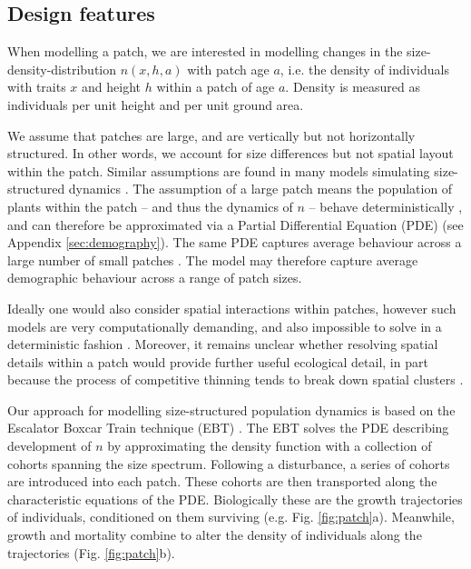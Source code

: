 \documentclass[a4paper,11pt]{article}
\begin{document}
\subsection{Design features}

When modelling a patch, we are interested in modelling changes in the
size-density-distribution \(n(x,h,a)\) with patch age \(a\), i.e. the density of
individuals with traits \(x\) and height \(h\) within a patch of age \(a\). Density
is measured as individuals per unit height and per unit ground area.

We assume that patches are large, and are vertically but not horizontally
structured. In other words, we account for size differences but not spatial 
layout within the patch. Similar assumptions are found in many models
simulating size-structured dynamics
\citep{Moorcroft-2001, Huston-1987, Smith-2014,Kohyama-1993}. The assumption of a large
patch means the population of plants within the patch -- and thus the 
dynamics of \(n\) -- behave deterministically \citep{Deroos-1997}, and can therefore be
approximated via a Partial Differential Equation (PDE) (see Appendix
\ref{sec:demography}). The same PDE captures average behaviour
across a large number of small patches \citep{Moorcroft-2001}. The model may 
therefore capture average demographic behaviour across a range of patch sizes.

Ideally one would also consider spatial interactions within patches,
however such models are very computationally demanding, and also
impossible to solve in a deterministic fashion \citep{Huston-1987, 
Pacala-1996}.
Moreover, it remains unclear whether resolving spatial details within a
patch would provide further useful ecological detail, in part because the
process of competitive thinning tends to break down spatial clusters
\citep{Strigul-2008}.

Our approach for modelling size-structured population dynamics
is based on the Escalator Boxcar Train technique (EBT)
\citep{Deroos-1997, Deroos-1992, Deroos-1988}. The EBT solves the PDE
describing development of \(n\) by approximating the density function
with a collection of cohorts spanning the size spectrum. Following a
disturbance, a series of cohorts are introduced into each patch. These
cohorts are then transported along the characteristic equations of the
PDE. Biologically these are the growth trajectories of individuals,
conditioned on them surviving (e.g. Fig. \ref{fig:patch}a). Meanwhile,
growth and mortality combine to alter the density of individuals along
the trajectories (Fig. \ref{fig:patch}b).
\end{document}
